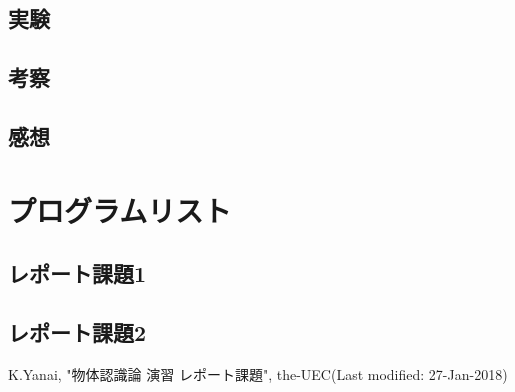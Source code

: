\documentclass[11pt,a4paper, uplatex]{jsreport}
\begin{document}
\section{実験}
\section{考察}
\section{感想}

\appendix
\chapter{プログラムリスト}
\section{レポート課題1}
\section{レポート課題2}
\begin{thebibliography}{数字}
   K.Yanai, "物体認識論 演習 レポート課題", the-UEC(Last modified: 27-Jan-2018)
\end{thebibliography}
\end{document}

